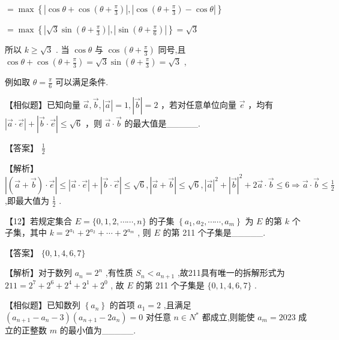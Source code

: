 \documentclass[10pt]{article}
\begin{document}
\(= \max \left\{  {\left| {\cos \theta  + \cos \left( {\theta  + \frac{\pi }{3}}\right) }\right| ,\left| {\cos \left( {\theta  + \frac{\pi }{3}}\right)  - \cos \theta }\right| }\right\}\)

\(= \max \left\{  {\left| {\sqrt{3}\sin \left( {\theta  + \frac{\pi }{3}}\right) }\right| ,\left| {\sin \left( {\theta  + \frac{\pi }{6}}\right) }\right| }\right\}   = \sqrt{3}\)

所以 \(k \geq  \sqrt{3}\) . 当 \(\cos \theta\) 与 \(\cos \left( {\theta  + \frac{\pi }{3}}\right)\) 同号,且 \(\cos \theta  + \cos \left( {\theta  + \frac{\pi }{3}}\right)  = \sqrt{3}\sin \left( {\theta  + \frac{\pi }{3}}\right)  = \sqrt{3}\) ,

例如取 \(\theta  = \frac{\pi }{6}\) 可以满足条件.

【相似题】已知向量 \(\overrightarrow{a},\overrightarrow{b},\left| \overrightarrow{a}\right|  = 1,\left| \overrightarrow{b}\right|  = 2\) ，若对任意单位向量 \(\overrightarrow{e}\) ，均有 \(\left| {\overrightarrow{a} \cdot  \overrightarrow{e}}\right|  + \left| {\overrightarrow{b} \cdot  \overrightarrow{e}}\right|  \leq  \sqrt{6}\) ，则 \(\overrightarrow{a} \cdot  \overrightarrow{b}\) 的最大值是\_\_\_\_\_.

【答案】 \(\frac{1}{2}\)

【解析】 \(\left| {\left( {\overrightarrow{a} + \overrightarrow{b}}\right)  \cdot  \overrightarrow{e}}\right|  \leq  \left| {\overrightarrow{a} \cdot  \overrightarrow{e}}\right|  + \left| {\overrightarrow{b} \cdot  \overrightarrow{e}}\right|  \leq  \sqrt{6},\left| {\overrightarrow{a} + \overrightarrow{b}}\right|  \leq  \sqrt{6},{\left| \overrightarrow{a}\right| }^{2} + {\left| \overrightarrow{b}\right| }^{2} + 2\overrightarrow{a} \cdot  \overrightarrow{b} \leq  6 \Rightarrow  \overrightarrow{a} \cdot  \overrightarrow{b} \leq  \frac{1}{2}\) ,即最大值为 \(\frac{1}{2}\) .

【12】若规定集合 \(E = \{ 0,1,2,\cdots \cdots ,n\}\) 的子集 \(\left\{  {{a}_{1},{a}_{2},\cdots \cdots ,{a}_{m}}\right\}\) 为 \(E\) 的第 \(k\) 个子集，其中 \(k = {2}^{{a}_{1}} + {2}^{{a}_{2}} + \cdots  + {2}^{{a}_{m}}\) , 则 \(E\) 的第 211 个子集是\_\_\_\_\_.

【答案】 \(\{ 0,1,4,6,7\}\)

【解析】对于数列 \({a}_{n} = {2}^{n}\) ,有性质 \({S}_{n} < {a}_{n + 1}\) ,故211具有唯一的拆解形式为 \({211} = {2}^{7} + {2}^{6} + {2}^{4} + {2}^{1} + {2}^{0}\) , 故 \(E\) 的第 211 个子集是 \(\{ 0,1,4,6,7\}\) .

【相似题】已知数列 \(\left\{  {a}_{n}\right\}\) 的首项 \({a}_{1} = 2\) ,且满足 \(\left( {{a}_{n + 1} - {a}_{n} - 3}\right) \left( {{a}_{n + 1} - 2{a}_{n}}\right)  = 0\) 对任意 \(n \in  {N}^{ * }\) 都成立,则能使 \({a}_{m} = {2023}\) 成立的正整数 \(m\) 的最小值为\_\_\_\_\_.
\end{document}
